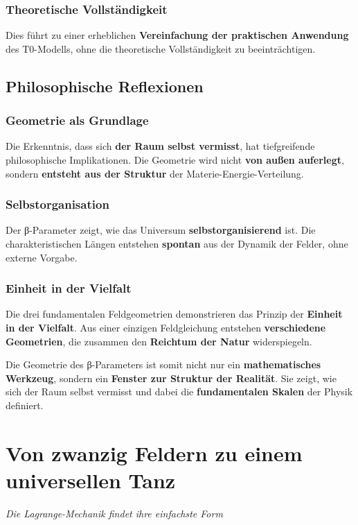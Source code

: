 \documentclass[12pt,a4paper]{report}
\begin{document}
\subsection{Theoretische Vollständigkeit}

Dies führt zu einer erheblichen \textbf{Vereinfachung der praktischen Anwendung} des T0-Modells, ohne die theoretische Vollständigkeit zu beeinträchtigen.

\section{Philosophische Reflexionen}

\subsection{Geometrie als Grundlage}

Die Erkenntnis, dass sich \textbf{der Raum selbst vermisst}, hat tiefgreifende philosophische Implikationen. Die Geometrie wird nicht \textbf{von außen auferlegt}, sondern \textbf{entsteht aus der Struktur} der Materie-Energie-Verteilung.

\subsection{Selbstorganisation}

Der β-Parameter zeigt, wie das Universum \textbf{selbstorganisierend} ist. Die charakteristischen Längen entstehen \textbf{spontan} aus der Dynamik der Felder, ohne externe Vorgabe.

\subsection{Einheit in der Vielfalt}

Die drei fundamentalen Feldgeometrien demonstrieren das Prinzip der \textbf{Einheit in der Vielfalt}. Aus einer einzigen Feldgleichung entstehen \textbf{verschiedene Geometrien}, die zusammen den \textbf{Reichtum der Natur} widerspiegeln.

Die Geometrie des β-Parameters ist somit nicht nur ein \textbf{mathematisches Werkzeug}, sondern ein \textbf{Fenster zur Struktur der Realität}. Sie zeigt, wie sich der Raum selbst vermisst und dabei die \textbf{fundamentalen Skalen} der Physik definiert.
% 
	\chapter{Von zwanzig Feldern zu einem universellen Tanz}
	\textit{Die Lagrange-Mechanik findet ihre einfachste Form}
	
\end{document}
